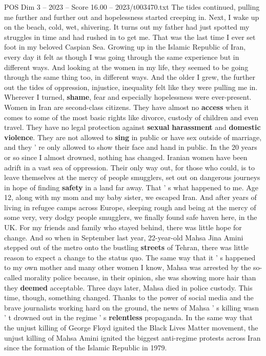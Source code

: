 \begin{textsample}{POS Dim 3 – 2023 – Score 16.00 – 2023/t003470.txt}
The tides continued, pulling me further and further out and hopelessness started creeping in.
Next, I wake up on the beach, cold, wet, shivering.
It turns out my father had just spotted my struggles in time and had rushed in to get me.
That was the last time I ever set foot in my beloved Caspian Sea.
Growing up in the Islamic Republic of Iran, every day it felt as though I was going through the same experience but in different ways.
And looking at the women in my life, they seemed to be going through the same thing too, in different ways.
And the older I grew, the further out the tides of oppression, injustice, inequality felt like they were pulling me in.
Wherever I turned, \textbf{shame}, fear and especially hopelessness were ever-present.
Women in Iran are second-class citizens.
They have almost no \textbf{access} when it comes to some of the most basic rights like divorce, custody of children and even travel.
They have no legal protection against \textbf{sexual} \textbf{harassment} and \textbf{domestic} \textbf{violence}.
They are not allowed to \textbf{sing} in public or have sex outside of marriage, and they ' re only allowed to show their face and hand in public.
In the 20 years or so since I almost drowned, nothing has changed.
Iranian women have been adrift in a vast sea of oppression.
Their only way out, for those who could, is to leave themselves at the mercy of people smugglers, set out on dangerous journeys in hope of finding \textbf{safety} in a land far away.
That ' s what happened to me.
Age 12, along with my mom and my baby sister, we escaped Iran.
And after years of living in refugee camps across Europe, sleeping rough and being at the mercy of some very, very dodgy people smugglers, we finally found safe haven here, in the UK.
For my friends and family who stayed behind, there was little hope for change.
And so when in September last year, 22-year-old Mahsa Jina Amini stepped out of the metro onto the bustling \textbf{streets} of Tehran, there was little reason to expect a change to the status quo.
The same way that it ' s happened to my own mother and many other women I know, Mahsa was arrested by the so-called morality police because, in their opinion, she was showing more hair than they \textbf{deemed} acceptable.
Three days later, Mahsa died in police custody.
This time, though, something changed.
Thanks to the power of social media and the brave journalists working hard on the ground, the news of Mahsa ' s killing wasn ' t drowned out in the regime ' s \textbf{relentless} propaganda.
In the same way that the unjust killing of George Floyd ignited the Black Lives Matter movement, the unjust killing of Mahsa Amini ignited the biggest anti-regime protests across Iran since the formation of the Islamic Republic in 1979.

\end{textsample}

